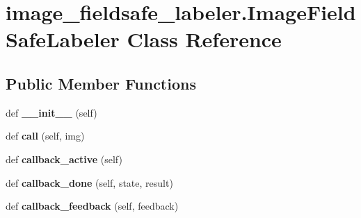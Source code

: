 \hypertarget{classimage__fieldsafe__labeler_1_1ImageFieldSafeLabeler}{}\section{image\+\_\+fieldsafe\+\_\+labeler.\+Image\+Field\+Safe\+Labeler Class Reference}
\label{classimage__fieldsafe__labeler_1_1ImageFieldSafeLabeler}
\subsection*{Public Member Functions}
\begin{DoxyCompactItemize}
\item 
\mbox{\label{classimage__fieldsafe__labeler_1_1ImageFieldSafeLabeler_ade44c930d1cfd5d4054ffdf165d05baf}} 
def {\bfseries \+\_\+\+\_\+init\+\_\+\+\_\+} (self)
\item 
\mbox{\label{classimage__fieldsafe__labeler_1_1ImageFieldSafeLabeler_ae923b212dfe2a67a8d846f236983d7f2}} 
def {\bfseries call} (self, img)
\item 
\mbox{\label{classimage__fieldsafe__labeler_1_1ImageFieldSafeLabeler_a12976330dcee9a3aaaf7ef6f94efbac2}} 
def {\bfseries callback\+\_\+active} (self)
\item 
\mbox{\label{classimage__fieldsafe__labeler_1_1ImageFieldSafeLabeler_a2f50bcb7b49b7d50c161ec4db90a6450}} 
def {\bfseries callback\+\_\+done} (self, state, result)
\item 
\mbox{\label{classimage__fieldsafe__labeler_1_1ImageFieldSafeLabeler_a953d7d26ef7622abb97ea4725443b864}} 
def {\bfseries callback\+\_\+feedback} (self, feedback)
\end{DoxyCompactItemize}
